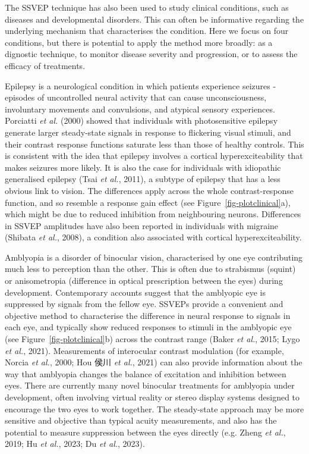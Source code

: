 \documentclass[
  letterpaper,
  DIV=11,
  numbers=noendperiod]{scrartcl}
\begin{document}
The SSVEP technique has also been used to study clinical conditions,
such as diseases and developmental disorders. This can often be
informative regarding the underlying mechanism that characterises the
condition. Here we focus on four conditions, but there is potential to
apply the method more broadly: as a dignostic technique, to monitor
disease severity and progression, or to assess the efficacy of
treatments.

Epilepsy is a neurological condition in which patients experience
seizures - episodes of uncontrolled neural activity that can cause
unconsciousness, involuntary movements and convulsions, and atypical
sensory experiences. Porciatti \emph{et al.} (2000) showed that
individuals with photosensitive epilepsy generate larger steady-state
signals in response to flickering visual stimuli, and their contrast
response functions saturate less than those of healthy controls. This is
consistent with the idea that epilepsy involves a cortical
hyperexciteability that makes seizures more likely. It is also the case
for individuals with idiopathic generalised epilepsy (Tsai \emph{et
al.}, 2011), a subtype of epilepsy that has a less obvious link to
vision. The differences apply across the whole contrast-response
function, and so resemble a response gain effect (see
Figure~\ref{fig-plotclinical}a), which might be due to reduced
inhibition from neighbouring neurons. Differences in SSVEP amplitudes
have also been reported in individuals with migraine (Shibata \emph{et
al.}, 2008), a condition also associated with cortical
hyperexciteability.

Amblyopia is a disorder of binocular vision, characterised by one eye
contributing much less to perception than the other. This is often due
to strabismus (squint) or anisometropia (difference in optical
prescription between the eyes) during development. Contemporary accounts
suggest that the amblyopic eye is suppressed by signals from the fellow
eye. SSVEPs provide a convenient and objective method to characterise
the difference in neural response to signals in each eye, and typically
show reduced responses to stimuli in the amblyopic eye (see
Figure~\ref{fig-plotclinical}b) across the contrast range (Baker
\emph{et al.}, 2015; Lygo \emph{et al.}, 2021). Measurements of
interocular contrast modulation (for example, Norcia \emph{et al.},
2000; Hou 侯川 \emph{et al.}, 2021) can also provide information about
the way that amblyopia changes the balance of excitation and inhibition
between eyes. There are currently many novel binocular treatments for
amblyopia under development, often involving virtual reality or stereo
display systems designed to encourage the two eyes to work together. The
steady-state approach may be more sensitive and objective than typical
acuity measurements, and also has the potential to measure suppression
between the eyes directly (e.g. Zheng \emph{et al.}, 2019; Hu \emph{et
al.}, 2023; Du \emph{et al.}, 2023).
\end{document}
